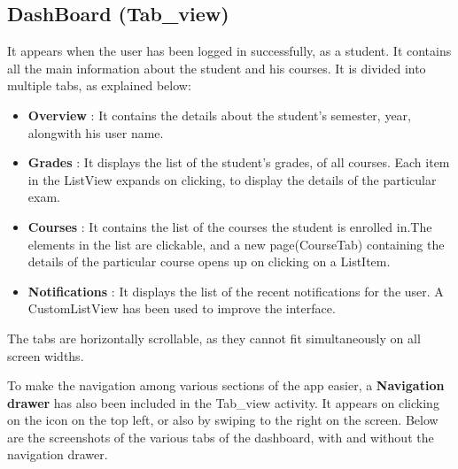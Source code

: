 \documentclass{article}
\begin{document}
\subsection{DashBoard (Tab\_view)}
It appears when the user has been logged in successfully, as a student. It contains all the main information about the student and his courses.
It is divided into multiple tabs, as explained below:
\begin{itemize}
\item \textbf{Overview} : It contains the details about the student's semester, year, alongwith his user name.
\item \textbf{Grades} : It displays the list of the student's grades, of all courses. Each item in the ListView expands on clicking, to display the details of the particular exam.
\item \textbf{Courses} : It contains the list of the courses the student is enrolled in.The elements in the list are clickable, and a new page(CourseTab) containing the details of the particular course opens up on clicking on a ListItem.
\item \textbf{Notifications} : It displays the list of the recent notifications for the user. A CustomListView has been used to improve the interface.
\end{itemize}
\par\noindent The tabs are horizontally scrollable, as they cannot fit simultaneously on all screen widths.
\par\noindent To make the navigation among various sections of the app easier, a \textbf{Navigation drawer} has also been included in the Tab\_view activity. It appears on clicking on the icon on the top left, or also by swiping to the right on the screen.
 Below are the screenshots of the various tabs of the dashboard, with and without the navigation drawer.
\end{document}
